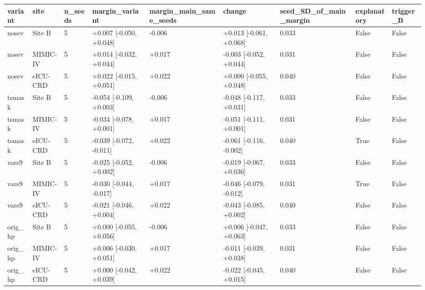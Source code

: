 \begin{tabular}{lllllllll}
\hline
variant & site & n\_seeds & margin\_variant & margin\_main\_same\_seeds & change & seed\_SD\_of\_main\_margin & explanatory & trigger\_B \\
\hline
nosev & Site B & 5 & +0.007 [-0.050, +0.048] & -0.006 & +0.013 [-0.061, +0.068] & 0.033 & False & False \\
nosev & MIMIC-IV & 5 & +0.014 [-0.032, +0.044] & +0.017 & -0.003 [-0.052, +0.044] & 0.031 & False & False \\
nosev & eICU-CRD & 5 & +0.022 [-0.015, +0.051] & +0.022 & +0.000 [-0.055, +0.048] & 0.040 & False & False \\
tsmask & Site B & 5 & -0.054 [-0.109, +0.003] & -0.006 & -0.048 [-0.117, +0.031] & 0.033 & False & False \\
tsmask & MIMIC-IV & 5 & -0.034 [-0.078, +0.001] & +0.017 & -0.051 [-0.111, +0.001] & 0.031 & False & False \\
tsmask & eICU-CRD & 5 & -0.039 [-0.072, -0.011] & +0.022 & -0.061 [-0.116, -0.002] & 0.040 & True & False \\
vars9 & Site B & 5 & -0.025 [-0.052, +0.002] & -0.006 & -0.019 [-0.067, +0.036] & 0.033 & False & False \\
vars9 & MIMIC-IV & 5 & -0.030 [-0.044, -0.017] & +0.017 & -0.046 [-0.079, -0.012] & 0.031 & True & False \\
vars9 & eICU-CRD & 5 & -0.021 [-0.046, +0.004] & +0.022 & -0.043 [-0.085, +0.002] & 0.040 & False & False \\
orig\_hp & Site B & 5 & +0.000 [-0.055, +0.056] & -0.006 & +0.006 [-0.047, +0.063] & 0.033 & False & False \\
orig\_hp & MIMIC-IV & 5 & +0.006 [-0.030, +0.051] & +0.017 & -0.011 [-0.039, +0.038] & 0.031 & False & False \\
orig\_hp & eICU-CRD & 5 & +0.000 [-0.042, +0.039] & +0.022 & -0.022 [-0.045, +0.015] & 0.040 & False & False \\
\hline
\end{tabular}
